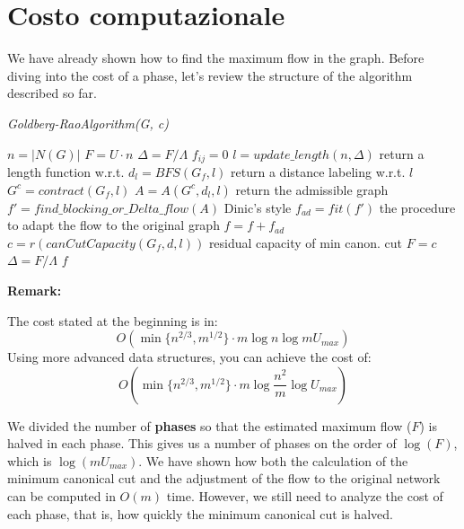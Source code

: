\section{Costo computazionale}
    We have already shown how to find the maximum flow in the graph.
    Before diving into the cost of a phase, let's review the structure of the algorithm described so far.

    \begin{algorithm}
        \caption{\textit{Goldberg-RaoAlgorithm(G, c)}}
        \label{GoldbergRao}
        \begin{algorithmic}[1]
            \State $n = |N(G)|$
            \State $F = U\cdot n$
            \State $\Delta = F/ \Lambda$
                $f_{ij} = 0$
            \EndFor
                \State $l = update\_length(n, \Delta)$ \Comment return a length function w.r.t. \dlt
                \State $d_l = BFS(G_f, l)$ \Comment return a distance labeling w.r.t. $l$
                \State $G^c = contract(G_f, l)$ 
                \State $A = A(G^c, d_l, l)$ \Comment return the admissible graph
                \State $f' = find\_blocking\_or\_Delta\_flow(A)$ \Comment Dinic's style 
                \State $f_{ad} = fit(f')$ \Comment the procedure to adapt the flow to the original graph
                \State $f = f + f_{ad}$
                \State $c = r(canCutCapacity(G_f,d, l))$ \Comment residual capacity of min canon. cut 
                    \State $F = c$
                    \State $\Delta = F/\Lambda$
                \EndIf
            \EndWhile 
            \State \Return $f$
        \end{algorithmic}
    \end{algorithm}

\textbf{Remark:}
        
        The cost stated at the beginning is in:
        \[O(\min \{n^{2/3}, m^{1/2}\}\cdot m \log n\log m U_{max})\]
        Using more advanced data structures, you can achieve the cost of:
        \[O(\min \{n^{2/3}, m^{1/2}\}\cdot m \log \frac{n^2}{m}\log U_{max})\]


      
        
    We divided the number of \textbf{phases} so that the estimated maximum flow (\( F \)) is halved in each phase.  
    This gives us a number of phases on the order of \( \log(F) \), which is \( \log(m U_{max}) \).  
    We have shown how both the calculation of the minimum canonical cut and the adjustment of the flow to the original network can be computed in \( O(m) \) time.  
    However, we still need to analyze the cost of each phase, that is, how quickly the minimum canonical cut is halved.
    
